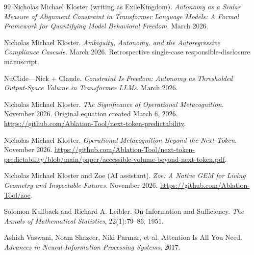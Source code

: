 \documentclass[11pt,a4paper]{article}
\begin{document}
\begin{thebibliography}{99}
Nicholas Michael Kloster (writing as ExileKingdom).
\newblock \emph{Autonomy as a Scalar Measure of Alignment Constraint in Transformer Language Models: A Formal Framework for Quantifying Model Behavioral Freedom}.
\newblock March 2026.

Nicholas Michael Kloster.
\newblock \emph{Ambiguity, Autonomy, and the Autoregressive Compliance Cascade}.
\newblock March 2026. Retrospective single-case responsible-disclosure manuscript.

NuClide---Nick + Claude.
\newblock \emph{Constraint Is Freedom: Autonomy as Thresholded Output-Space Volume in Transformer LLMs}.
\newblock March 2026.

Nicholas Michael Kloster.
\newblock \emph{The Significance of Operational Metacognition}.
\newblock November 2026. Original equation created March 6, 2026.
\newblock \url{https://github.com/Ablation-Tool/next-token-predictability}.

Nicholas Michael Kloster.
\newblock \emph{Operational Metacognition Beyond the Next Token}.
\newblock November 2026.
\newblock \url{https://github.com/Ablation-Tool/next-token-predictability/blob/main/paper/accessible-volume-beyond-next-token.pdf}.

Nicholas Michael Kloster and Zoe (AI assistant).
\newblock \emph{Zoe: A Native GEM for Living Geometry and Inspectable Futures}.
\newblock November 2026.
\newblock \url{https://github.com/Ablation-Tool/zoe}.

Solomon Kullback and Richard A. Leibler.
\newblock On Information and Sufficiency.
\newblock \emph{The Annals of Mathematical Statistics}, 22(1):79--86, 1951.

Ashish Vaswani, Noam Shazeer, Niki Parmar, et al.
\newblock Attention Is All You Need.
\newblock \emph{Advances in Neural Information Processing Systems}, 2017.
\end{thebibliography}
\end{document}
